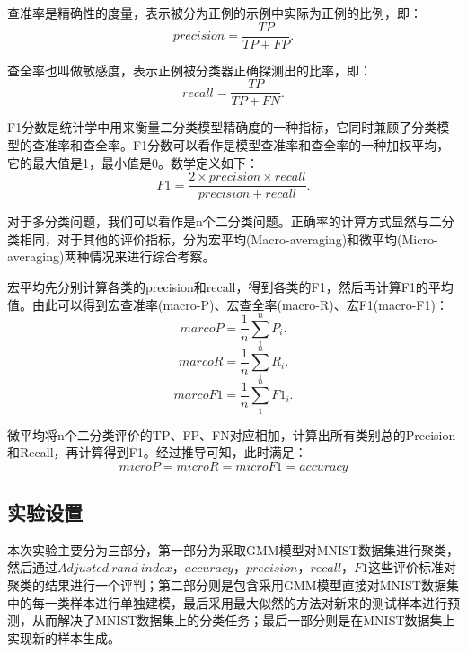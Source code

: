 \documentclass[UTF8]{ctexart}
\begin{document}
查准率是精确性的度量，表示被分为正例的示例中实际为正例的比例，即：
\begin{equation}
	precision = \frac{TP}{TP+FP}.
\end{equation}

查全率也叫做敏感度，表示正例被分类器正确探测出的比率，即：
\begin{equation}
	recall = \frac{TP}{TP+FN}.
\end{equation}

F1分数是统计学中用来衡量二分类模型精确度的一种指标，它同时兼顾了分类模型的查准率和查全率。F1分数可以看作是模型查准率和查全率的一种加权平均，它的最大值是1，最小值是0。数学定义如下：
\begin{equation}
	F1 = \frac{2\times{precision}\times{recall}}{precision+recall}.
\end{equation}

对于多分类问题，我们可以看作是n个二分类问题。正确率的计算方式显然与二分类相同，对于其他的评价指标，分为宏平均(Macro-averaging)和微平均(Micro-averaging)两种情况来进行综合考察。

宏平均先分别计算各类的precision和recall，得到各类的F1，然后再计算F1的平均值。由此可以得到宏查准率(macro-P)、宏查全率(macro-R)、宏F1(macro-F1)：
\begin{equation}
	marcoP=\frac{1}{n}\sum_1^nP_i.
\end{equation}
\begin{equation}
	marcoR=\frac{1}{n}\sum_1^nR_i.
\end{equation}
\begin{equation}
	marcoF1=\frac{1}{n}\sum_1^nF1_i.
\end{equation}

微平均将n个二分类评价的TP、FP、FN对应相加，计算出所有类别总的Precision和Recall，再计算得到F1。经过推导可知，此时满足：
\begin{equation}
	microP=microR=microF1=accuracy
\end{equation}

\subsection{实验设置}

本次实验主要分为三部分，第一部分为采取GMM模型对MNIST数据集进行聚类，然后通过$Adjusted~rand~index$，$accuracy$，$precision$，$recall$，$F1$这些评价标准对聚类的结果进行一个评判；第二部分则是包含采用GMM模型直接对MNIST数据集中的每一类样本进行单独建模，最后采用最大似然的方法对新来的测试样本进行预测，从而解决了MNIST数据集上的分类任务；最后一部分则是在MNIST数据集上实现新的样本生成。
\end{document}
